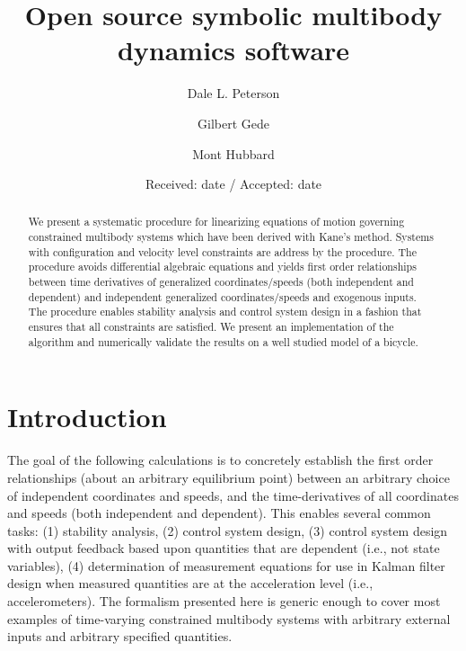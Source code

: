 \documentclass{svjour3}                     %
\begin{document}
\title{Open source symbolic multibody dynamics software}


\author{Dale L. Peterson\and Gilbert Gede\and Mont Hubbard}


\date{Received: date / Accepted: date}

\maketitle

\begin{abstract}
  We present a systematic procedure for linearizing equations of motion
  governing constrained multibody systems which have been derived with Kane's
  method.  Systems with configuration and velocity level constraints are
  address by the procedure.  The procedure avoids differential algebraic
  equations and yields first order relationships between time derivatives of
  generalized coordinates/speeds (both independent and dependent) and
  independent generalized coordinates/speeds and exogenous inputs.  The
  procedure enables stability analysis and control system design in a fashion
  that ensures that all constraints are satisfied.  We present an
  implementation of the algorithm and numerically validate the results on a
  well studied model of a bicycle.
\end{abstract}

\section{Introduction}
\label{intro}

The goal of the following calculations is to concretely establish the first
order relationships (about an arbitrary equilibrium point) between an arbitrary
choice of independent coordinates and speeds, and the time-derivatives of all
coordinates and speeds (both independent and dependent).  This enables several
common tasks: (1) stability analysis, (2) control system design, (3) control system design with output feedback based
upon quantities that are dependent (i.e., not state variables), (4)
determination of measurement equations for use in Kalman filter design when
measured quantities are at the acceleration level (i.e., accelerometers).  The
formalism presented here is generic enough to cover most examples of
time-varying constrained multibody systems with arbitrary external inputs and
arbitrary specified quantities.
\end{document}
